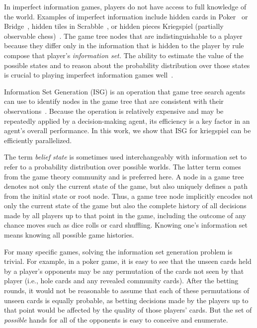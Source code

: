 \documentclass[times, 10pt,twocolumn]{article}
\begin{document}
In imperfect information games, players do not have access to full knowledge of
the world. Examples of imperfect information include hidden cards in
Poker~\cite{billings02challenge} or Bridge~\cite{ginsberg96partition}, hidden
tiles in Scrabble~\cite{richards07opponent}, or hidden pieces 
Kriegspiel (partially observable chess)~\cite{li94chess}. The game tree nodes
that are indistinguishable to a player because they differ only in the
information that is hidden to the player by rule compose that player's {\em
information set.}  The ability to estimate the value of the possible states and
to reason about the probability distribution over those states is crucial to
playing imperfect information games well~\cite{thielscher12hyperplay}. 

Information Set Generation (ISG) is an operation that game tree search agents
can use to identify nodes in the game tree that are consistent with their
observations~\cite{richards12reasoning}.  Because the operation is relatively
expensive and may be repeatedly applied by a decision-making agent, its
efficiency is a key factor in an agent's overall performance.  In this work, we
show that ISG for kriegspiel can be efficiently parallelized.

The term {\em belief state} is sometimes used interchangeably with information set to refer to a probability
distribution over possible worlds.  The latter term comes from the game theory community and is preferred here.  A node
in a game tree denotes not only the current state of the game, but also uniquely defines a path from the initial state
or root node.  Thus, a game tree node implicitly encodes not only the current state of the game but also the complete
history of all decisions made by all players up to that point in the game, including the outcome of any chance moves
such as dice rolls or card shuffling.  Knowing one's information set means knowing all possible game histories.

For many specific games, solving the information set generation problem is trivial.  For example, in a poker game, it is easy to
see that the unseen cards held by a player's opponents may be any permutation of the cards not seen by that player
(i.e., hole cards and any revealed community cards).  After the betting rounds, it would not be reasonable to assume
that each of these permutations of unseen cards is equally probable, as betting decisions made by the players up to that
point would be affected by the quality of those players' cards.  But the set of {\em possible} hands for all of the
opponents is easy to conceive and enumerate.
\end{document}
